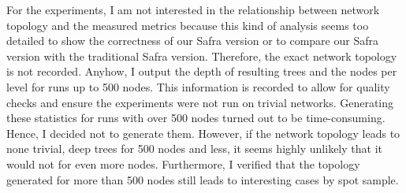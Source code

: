 For the experiments, I am not interested in the relationship between network topology and the measured metrics because this kind of analysis seems too detailed to show the correctness of our Safra version or to compare
our Safra version with the traditional Safra version.
Therefore, the exact network topology is not recorded.
Anyhow, I output the depth of resulting trees and the nodes per level for runs up to 500 nodes.
This information is recorded to allow for quality checks and ensure the experiments were not run on trivial networks.
Generating these statistics for runs with over 500 nodes turned out to be time-consuming.
Hence, I decided not to generate them.
However, if the network topology leads to none trivial, deep trees for 500 nodes and less, it seems highly unlikely that it would not for even more nodes.
Furthermore, I verified that the topology generated for more than 500 nodes still leads to interesting cases by spot sample.

